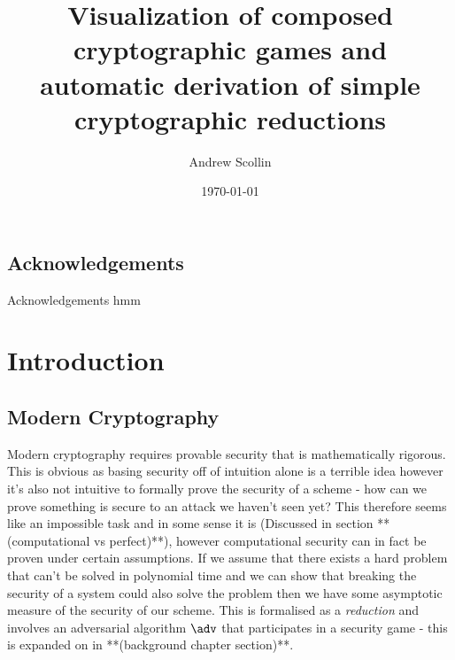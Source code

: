 \documentclass[bsc,frontabs,singlespacing,parskip,deptreport]{infthesis}
\begin{document}
\begin{preliminary}


\title{Visualization of composed cryptographic games and automatic derivation of simple cryptographic reductions}

\author{Andrew Scollin }



\date{\today}

\maketitle

\section*{Acknowledgements}
Acknowledgements hmm

\tableofcontents
\end{preliminary}



\chapter{Introduction}

\section{Modern Cryptography}
Modern cryptography requires provable security that is mathematically rigorous. This is obvious as basing security off of intuition alone is a terrible idea however it's also not intuitive to formally prove the security of a scheme - how can we prove something is secure to an attack we haven't seen yet? This therefore seems like an impossible task and in some sense it is (Discussed in section **(computational vs perfect)**), however computational security can in fact be proven under certain assumptions. If we assume that there exists a hard problem that can't be solved in polynomial time and we can show that breaking the security of a system could also solve the problem then we have some asymptotic measure of the security of our scheme. This is formalised as a \textit{reduction} and involves an adversarial algorithm $\adv$ that participates in a security game - this is expanded on in **(background chapter section)**.  
\end{document}
